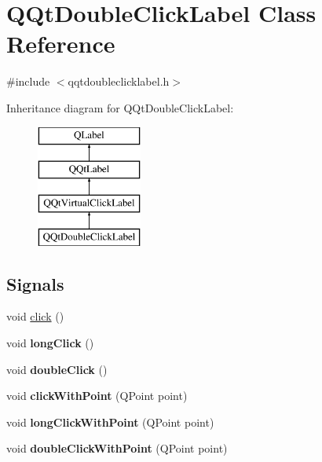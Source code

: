 \hypertarget{class_q_qt_double_click_label}{}\section{Q\+Qt\+Double\+Click\+Label Class Reference}
\label{class_q_qt_double_click_label}


{\ttfamily \#include $<$qqtdoubleclicklabel.\+h$>$}

Inheritance diagram for Q\+Qt\+Double\+Click\+Label\+:\begin{figure}[H]
\begin{center}
\leavevmode
\includegraphics[height=4.000000cm]{class_q_qt_double_click_label}
\end{center}
\end{figure}
\subsection*{Signals}
\begin{DoxyCompactItemize}
\item 
void \mbox{\hyperlink{class_q_qt_double_click_label_a32c81b1f92fce25f4b484986c1c30c72}{click}} ()
\item 
\mbox{\label{class_q_qt_double_click_label_ae5e3e6d741d8685d1e33daa6ac339a7a}} 
void {\bfseries long\+Click} ()
\item 
\mbox{\label{class_q_qt_double_click_label_aa73e7a5778c52cd171cd971bd5b1e40d}} 
void {\bfseries double\+Click} ()
\item 
\mbox{\label{class_q_qt_double_click_label_a29cc2b14ee36b9c5b5ed4197736c1857}} 
void {\bfseries click\+With\+Point} (Q\+Point point)
\item 
\mbox{\label{class_q_qt_double_click_label_af46ab776d59a3cd824bfa1b481c60e7b}} 
void {\bfseries long\+Click\+With\+Point} (Q\+Point point)
\item 
\mbox{\label{class_q_qt_double_click_label_aeaa7a312cd952e7b5c53fb700611346d}} 
void {\bfseries double\+Click\+With\+Point} (Q\+Point point)
\end{DoxyCompactItemize}
